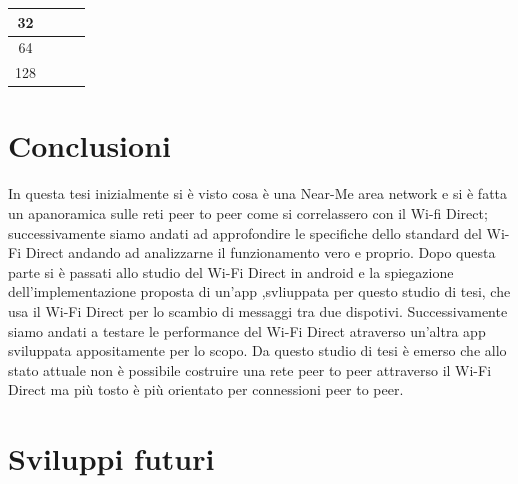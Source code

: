 \begin{table}[]
\begin{tabular}{|c|c|c|c|}
    32                                                             & \multicolumn{1}{l|}{}                                                    &                                                                                     &                                                                                               \\ \hline
    64                                                             & \multicolumn{1}{l|}{}                                                    &                                                                                     &                                                                                               \\ \hline
    128                                                            & \multicolumn{1}{l|}{}                                                    &                                                                                     &                                                                                               \\ \hline
    \end{tabular}
    \end{table}

\section{Conclusioni}
In questa tesi inizialmente si è visto cosa è una Near-Me area network e
si è fatta un apanoramica sulle reti peer to peer come si correlassero
con il Wi-fi Direct; successivamente siamo andati ad approfondire le specifiche
dello standard del Wi-Fi Direct andando ad analizzarne il
 funzionamento vero e proprio.
Dopo questa parte si è passati allo studio del Wi-Fi Direct
in android e la spiegazione dell'implementazione
proposta di un'app ,svliuppata per questo studio di tesi,
che usa il Wi-Fi Direct per lo scambio di messaggi 
tra due dispotivi.
Successivamente siamo andati a testare le performance del Wi-Fi Direct
atraverso un'altra app sviluppata appositamente per lo scopo.
Da questo studio di tesi è emerso che allo stato attuale 
non è possibile costruire una rete peer to peer
attraverso il Wi-Fi Direct ma più tosto è più orientato
per connessioni peer to peer.
\section{Sviluppi futuri}






